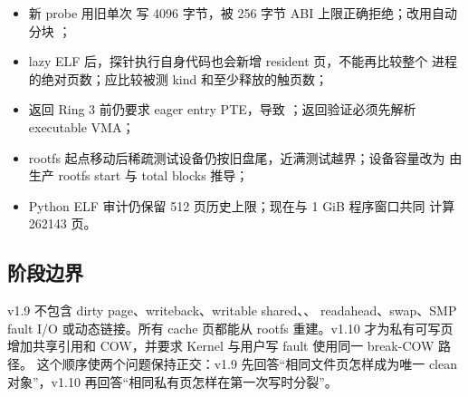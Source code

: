 \begin{itemize}
  \item 新 probe 用旧单次  写 4096 字节，被 256 字节 ABI
        上限正确拒绝；改用自动分块 ；
  \item lazy ELF 后，探针执行自身代码也会新增 resident 页，不能再比较整个
       进程的绝对页数；应比较被测 kind 和至少释放的触页数；
  \item 返回 Ring 3 前仍要求 eager entry PTE，导致
        ；返回验证必须先解析 executable VMA；
  \item rootfs 起点移动后稀疏测试设备仍按旧盘尾，近满测试越界；设备容量改为
       由生产 rootfs start 与 total blocks 推导；
  \item Python ELF 审计仍保留 512 页历史上限；现在与 1 GiB 程序窗口共同
       计算 262143 页。
\end{itemize}

\subsection{阶段边界}

v1.9 不包含 dirty page、writeback、writable shared、、
readahead、swap、SMP fault I/O 或动态链接。所有 cache 页都能从 rootfs
重建。v1.10 才为私有可写页增加共享引用和 COW，并要求 Kernel
 与用户写 fault 使用同一 break-COW 路径。
这个顺序使两个问题保持正交：v1.9 先回答“相同文件页怎样成为唯一 clean
对象”，v1.10 再回答“相同私有页怎样在第一次写时分裂”。
